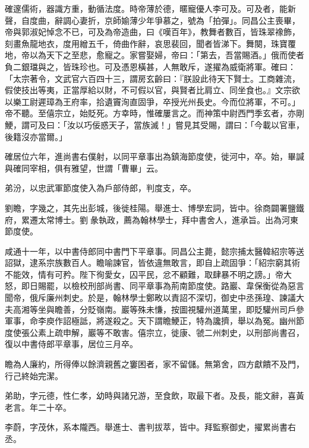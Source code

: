 \begin{pinyinscope}
 確邃儒術，器識方重，動循法度。時帝薄於德，暱寵優人李可及。可及者，能新聲，自度曲，辭調心妻折，京師媮薄少年爭慕之，號為「拍彈」。同昌公主喪畢，帝與郭淑妃悼念不已，可及為帝造曲，曰《嘆百年》，教舞者數百，皆珠翠襐飾，刻畫魚龍地衣，度用繒五千，倚曲作辭，哀思裴回，聞者皆涕下。舞闋，珠寶覆地，帝以為天下之至悲，愈寵之。家嘗娶婦，帝曰：「第去，吾當賜酒。」俄而使者負二銀璫與之，皆珠珍也。可及憑恩橫甚，人無敢斥，遂擢為威衛將軍。確曰：「太宗著令，文武官六百四十三，謂房玄齡曰：『朕設此待天下賢士。工商雜流，假使技出等夷，正當厚給以財，不可假以官，與賢者比肩立、同坐食也。』文宗欲以樂工尉遲璋為王府率，拾遺竇洵直固爭，卒授光州長史。今而位將軍，不可。」帝不聽。至僖宗立，始貶死。方幸時，惟確屢言之。而神策中尉西門季玄者，亦剛鯁，謂可及曰：「汝以巧佞惑天子，當族滅！」嘗見其受賜，謂曰：「今載以官車，後籍沒亦當爾。」



 確居位六年，進尚書右僕射，以同平章事出為鎮海節度使，徙河中，卒。始，畢諴與確同宰相，俱有雅望，世謂「曹畢」云。



 弟汾，以忠武軍節度使入為戶部侍郎，判度支，卒。



 劉瞻，字幾之，其先出彭城，後徙桂陽。舉進士、博學宏詞，皆中。徐商闢署鹽鐵府，累遷太常博士。劉彖執政，薦為翰林學士，拜中書舍人，進承旨。出為河東節度使。



 咸通十一年，以中書侍郎同中書門下平章事。同昌公主薨，懿宗捕太醫韓紹宗等送詔獄，逮系宗族數百人。瞻喻諫官，皆依違無敢言，即自上疏固爭：「紹宗窮其術不能效，情有可矜。陛下徇愛女，囚平民，忿不顧難，取肆暴不明之謗。」帝大怒，即日賜罷，以檢校刑部尚書、同平章事為荊南節度使。路巖、韋保衡從為惡言聞帝，俄斥廉州刺史。於是，翰林學士鄭畋以責詔不深切，御史中丞孫瑝、諫議大夫高湘等坐與瞻善，分貶嶺南。巖等殊未慊，按圖視驩州道萬里，即貶驩州司戶參軍事，命李庾作詔極詆，將遂殺之。天下謂瞻鯁正，特為讒擠，舉以為冤。幽州節度使張公素上疏申解，巖等不敢害。僖宗立，徙康、虢二州刺史，以刑部尚書召，復以中書侍郎平章事，居位三月卒。



 瞻為人廉約，所得俸以餘濟親舊之窶困者，家不留儲。無第舍，四方獻饋不及門，行己終始完潔。



 弟助，字元德，性仁孝，幼時與諸兄游，至食飲，取最下者。及長，能文辭，喜黃老言。年二十卒。



 李蔚，字茂休，系本隴西。舉進士、書判拔萃，皆中。拜監察御史，擢累尚書右丞。




\end{pinyinscope}
